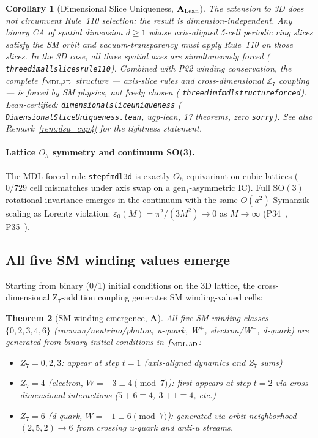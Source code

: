 \documentclass[11pt]{article}
\newtheorem{theorem}{Theorem}[section]
\newtheorem{corollary}[theorem]{Corollary}
\theoremstyle{remark}
\newcommand{\lean}[1]{%
  \penalty-100
  \begingroup\def\_{\textunderscore\allowbreak}\texttt{#1}\endgroup}
\newcommand{\CatA}{\textbf{A}}
\newcommand{\CatAL}{\ensuremath{\textbf{A}_{\rm Lean}}}
\begin{document}
\begin{corollary}[Dimensional Slice Uniqueness, $\CatAL$]
\label{cor:dsu}
The extension to 3D does not circumvent Rule~110 selection: the result is
dimension-independent.
Any binary CA of spatial dimension $d \geq 1$ whose axis-aligned 5-cell periodic ring
slices satisfy the SM orbit and vacuum-transparency must apply Rule~110 on those slices.
In the 3D case, all three spatial axes are simultaneously forced
(\lean{three\_dim\_all\_slices\_rule110}).
Combined with P22 winding conservation, the complete $f_{\rm MDL,3D}$ structure ---
axis-slice rules and cross-dimensional $\mathbb{Z}_7$ coupling --- is forced by SM physics,
not freely chosen (\lean{three\_dim\_fmdl\_structure\_forced}).
Lean-certified: \lean{dimensional\_slice\_uniqueness}
(\lean{Dimensional\-Slice\-Uniqueness.lean}, ugp-lean,
17 theorems, zero \texttt{sorry}).
See also Remark~\ref{rem:dsu_cup4} for the tightness statement.
\end{corollary}

\paragraph{Lattice \texorpdfstring{$O_h$}{Oh} symmetry and continuum \texorpdfstring{SO(3)}{SO(3)}.}
The MDL-forced rule \lean{step\_fmdl3d} is exactly $O_h$-equivariant on cubic lattices
($0/729$ cell mismatches under axis swap on a gen$_1$-asymmetric IC).
Full $\mathrm{SO}(3)$ rotational invariance emerges in the continuum with the same
$O(a^2)$ Symanzik scaling as Lorentz violation:
$\varepsilon_0(M) = \pi^2/(3M^2) \to 0$ as $M \to \infty$
(P34~\cite{SpivackGTEMobius}, P35~\cite{SpivackGTEUnification}).

\subsection{All five SM winding values emerge}

Starting from binary (0/1) initial conditions on the 3D lattice, the cross-dimensional
Z$_7$-addition coupling generates SM winding-valued cells:

\begin{theorem}[SM winding emergence, $\CatA$]
\label{thm:sm_emergence}
All five SM winding classes $\{0, 2, 3, 4, 6\}$ (vacuum/neutrino/photon, u-quark,
W$^+$, electron/W$^-$, d-quark) are generated from binary initial conditions in
$f_{\rm MDL, 3D}$:
\begin{itemize}
\item $Z_7 = 0, 2, 3$: appear at step $t = 1$ (axis-aligned dynamics and Z$_7$ sums)
\item $Z_7 = 4$ (electron, $W = -3 \equiv 4 \pmod 7$): first appears at step $t = 2$ via
  cross-dimensional interactions ($5 + 6 \equiv 4$, $3 + 1 \equiv 4$, etc.)
\item $Z_7 = 6$ (d-quark, $W = -1 \equiv 6 \pmod 7$): generated via orbit neighborhood
  $(2,5,2) \to 6$ from crossing u-quark and anti-u streams.
\end{itemize}
\end{theorem}
\end{document}
